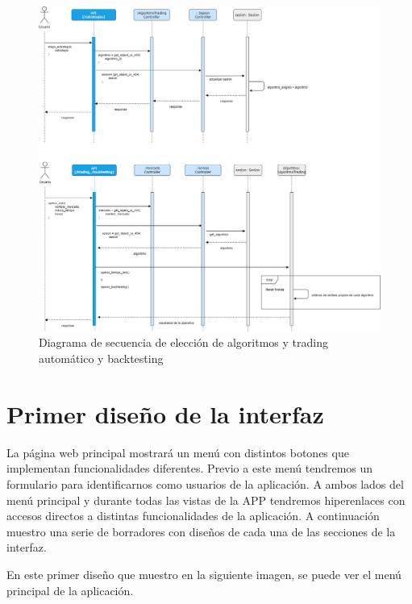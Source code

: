 \begin{figure}[h] 
	\includegraphics[width=1.35\textwidth]{imagenes/diagramas_secuencia/algoritmos_secuencia.png}
	\caption{Diagrama de secuencia de elección de algoritmos y trading automático y backtesting} \label{algoritmos_secuencia}
\end{figure}

\section{Primer diseño de la interfaz}

La página web principal mostrará un menú con distintos botones que implementan funcionalidades diferentes. Previo a este menú tendremos un formulario para identificarnos como usuarios de la aplicación. A ambos lados del menú principal y durante todas las vistas de la APP tendremos hiperenlaces con accesos directos a distintas funcionalidades de la aplicación. A continuación muestro una serie de borradores con diseños de cada una de las secciones de la interfaz.\newline

En este primer diseño que muestro en la siguiente imagen, se puede ver el menú principal de la aplicación.\newline

